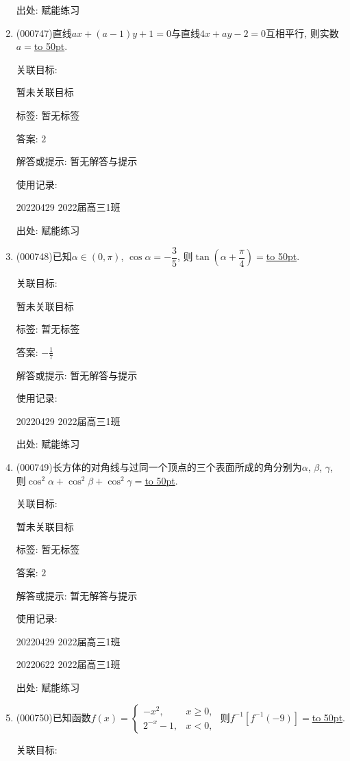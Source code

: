 \documentclass[10pt,a4paper]{article}
\newcommand{\blank}[1]{\underline{\hbox to #1pt{}}}
\begin{document}
\begin{enumerate}[1.]
出处: 赋能练习
\item { (000747)}直线$ax+(a-1)y+1=0$与直线$4x+ay-2=0$互相平行, 则实数$a=$\blank{50}.


关联目标:

暂未关联目标



标签: 暂无标签

答案: $2$

解答或提示: 暂无解答与提示

使用记录:

20220429	2022届高三1班	


出处: 赋能练习
\item { (000748)}已知$\alpha \in (0,\pi)$, $\cos\alpha =-\dfrac35$, 则$\tan(\alpha+\dfrac{\pi}4)=$\blank{50}.


关联目标:

暂未关联目标



标签: 暂无标签

答案: $-\frac 17$

解答或提示: 暂无解答与提示

使用记录:

20220429	2022届高三1班	


出处: 赋能练习
\item { (000749)}长方体的对角线与过同一个顶点的三个表面所成的角分别为$\alpha$, $\beta$, $\gamma$, 则$\cos^2\alpha+\cos^2\beta+\cos^2\gamma =$\blank{50}.


关联目标:

暂未关联目标



标签: 暂无标签

答案: $2$

解答或提示: 暂无解答与提示

使用记录:

20220429	2022届高三1班	

20220622	2022届高三1班  	


出处: 赋能练习
\item { (000750)}已知函数$f(x)=\begin{cases} -x^2, & x\ge 0,  \\2^{-x}-1, & x<0, \end{cases}$ 则$f^{-1}[f^{-1}(-9)]=$\blank{50}.


关联目标:


\end{enumerate}
\end{document}

